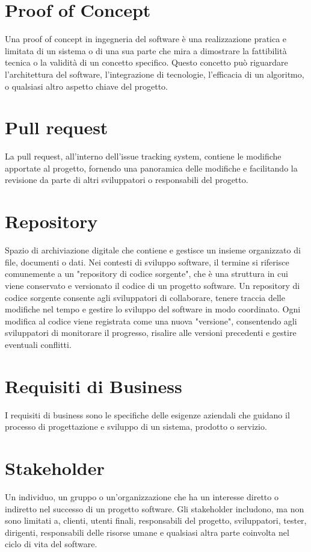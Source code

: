 \documentclass{article}
\begin{document}
\section{Proof of Concept}
Una proof of concept in ingegneria del software è una realizzazione pratica e limitata di un sistema o di una sua parte che mira a dimostrare la fattibilità tecnica o la validità di un concetto specifico. Questo concetto può riguardare l'architettura del software, l'integrazione di tecnologie, l'efficacia di un algoritmo, o qualsiasi altro aspetto chiave del progetto.

\section{Pull request}
La pull request, all'interno dell'issue tracking system, contiene le modifiche apportate al progetto, fornendo una panoramica delle modifiche e facilitando la revisione da parte di altri sviluppatori o responsabili del progetto.

\section{Repository}
Spazio di archiviazione digitale che contiene e gestisce un insieme organizzato di file, documenti o dati. Nei contesti di sviluppo software, il termine si riferisce comunemente a un "repository di codice sorgente", che è una struttura in cui viene conservato e versionato il codice di un progetto software. Un repository di codice sorgente consente agli sviluppatori di collaborare, tenere traccia delle modifiche nel tempo e gestire lo sviluppo del software in modo coordinato. Ogni modifica al codice viene registrata come una nuova "versione", consentendo agli sviluppatori di monitorare il progresso, risalire alle versioni precedenti e gestire eventuali conflitti.

\section{Requisiti di Business}
I  requisiti di business sono le specifiche delle esigenze aziendali che guidano il processo di progettazione e sviluppo di un sistema, prodotto o servizio.

\section{Stakeholder}
Un individuo, un gruppo o un'organizzazione che ha un interesse diretto o indiretto nel successo di un progetto software. Gli stakeholder includono, ma non sono limitati a, clienti, utenti finali, responsabili del progetto, sviluppatori, tester, dirigenti, responsabili delle risorse umane e qualsiasi altra parte coinvolta nel ciclo di vita del software.
\end{document}
